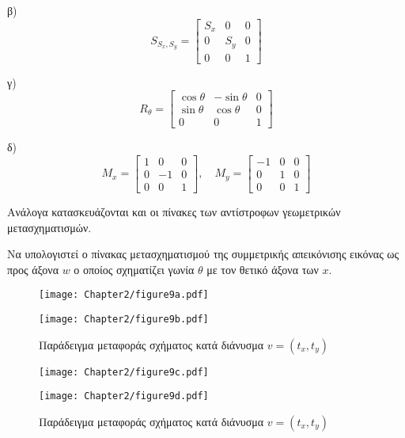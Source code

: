  β)  
\[
S_{S_x,S_y} = \begin{bmatrix} S_x & 0 & 0 \\ 0 & S_y & 0 \\ 0 & 0 & 1 \end{bmatrix}
\]

 γ)
\[
R_{\theta} = \begin{bmatrix} \cos\theta & -\sin\theta & 0 \\ \sin\theta & \cos\theta & 0 \\ 0 & 0 & 1 \end{bmatrix}
\]

 δ) 
\[
M_x = \begin{bmatrix} 1 & 0 & 0 \\ 0 & -1 & 0 \\ 0 & 0 & 1 \end{bmatrix}, \quad M_y = \begin{bmatrix} -1 & 0 & 0 \\ 0 & 1 & 0 \\ 0 & 0 & 1 \end{bmatrix}
\]

 Ανάλογα κατασκευάζονται και οι πίνακες των αντίστροφων γεωμετρικών μετασχηματισμών.

\begin{example}
Να υπολογιστεί ο πίνακας μετασχηματισμού της συμμετρικής απεικόνισης εικόνας ως προς άξονα \( w \) ο οποίος σχηματίζει γωνία \( \theta \) με τον θετικό άξονα των \( x. \)
\end{example}


\begin{figure}[h!]
	\begin{center}
		\begin{minipage}[b]{0.48\textwidth} %
		    \texttt{[image: Chapter2/figure9a.pdf]}
		\end{minipage}%
	\hfill
		\begin{minipage}[b]{0.48\textwidth} %
		    \texttt{[image: Chapter2/figure9b.pdf]}
		\end{minipage}
	\end{center}
\caption{Παράδειγμα μεταφοράς σχήματος κατά διάνυσμα $v = (t_x, t_y)$}
\end{figure}


\begin{figure}[h!]
	\begin{center}
		\begin{minipage}[b]{0.48\textwidth} %
		    \texttt{[image: Chapter2/figure9c.pdf]}
		\end{minipage}%
	\hfill
		\begin{minipage}[b]{0.48\textwidth} %
		    \texttt{[image: Chapter2/figure9d.pdf]}
		\end{minipage}
	\end{center}
\caption{Παράδειγμα μεταφοράς σχήματος κατά διάνυσμα $v = (t_x, t_y)$}
\end{figure}



